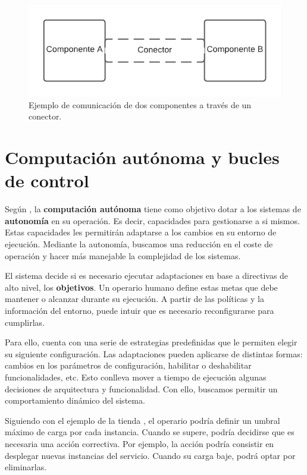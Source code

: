 \begin{figure}[h!]
  \centering
  \includegraphics[scale=0.78]{cap_contexto_tecnologico/images/conector}
  \caption{Ejemplo de comunicación de dos componentes a través de un conector.}
  \label{fig:componentesYConectorEjemplo}
\end{figure}

\section{Computación autónoma y bucles de control}

Según \cite{ibmcorporationArchitecturalBlueprintAutonomic2006}, la \textbf{computación autónoma} tiene como objetivo dotar a los sistemas de \textbf{autonomía} en su operación. Es decir, capacidades para gestionarse a si mismos. Estas capacidades les permitirán adaptarse a los cambios en su entorno de ejecución. Mediante la autonomía, buscamos una reducción en el coste de operación y hacer más manejable la complejidad de los sistemas.

El sistema decide si es necesario ejecutar adaptaciones en base a directivas de alto nivel, los \textbf{objetivos}. Un operario humano define estas metas que debe mantener o alcanzar durante su ejecución. A partir de las políticas y la información del entorno, puede intuir que es necesario reconfigurarse para cumplirlas.

Para ello, cuenta con una serie de estrategias predefinidas que le permiten elegir su siguiente configuración. \cite{garlanIncreasingSystemDependability2003} Las adaptaciones pueden aplicarse de distintas formas: cambios en los parámetros de configuración, habilitar o deshabilitar funcionalidades, etc. Esto conlleva mover a tiempo de ejecución algunas decisiones de arquitectura y funcionalidad. Con ello, buscamos permitir un comportamiento dinámico del sistema. \cite{brunEngineeringSelfAdaptiveSystems2009}

Siguiendo con el ejemplo de la tienda , el operario podría definir un umbral máximo de carga por cada instancia. Cuando se supere, podría decidirse que es necesaria una acción correctiva. Por ejemplo, la acción podría consistir en desplegar nuevas instancias del servicio. Cuando su carga baje, podrá optar por eliminarlas.


